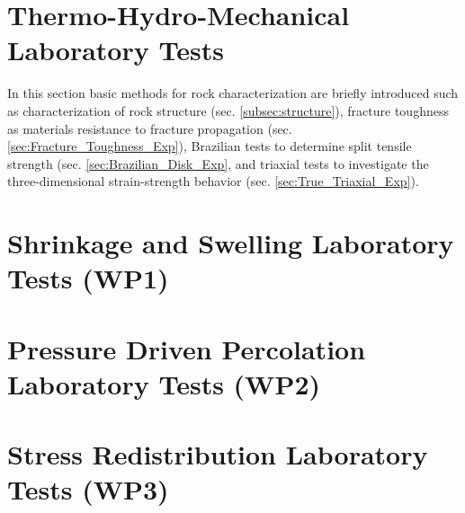 \section{Thermo-Hydro-Mechanical Laboratory Tests}
\label{sec:thm-lab-tests}
In this section basic methods for rock characterization are briefly introduced such as 
characterization of rock structure (sec. \ref{subsec:structure}),
fracture toughness as materials resistance to fracture propagation (sec. \ref{sec:Fracture_Toughness_Exp}),
Brazilian tests to determine split tensile strength (sec. \ref{sec:Brazilian_Disk_Exp},
and triaxial tests to investigate the three-dimensional strain-strength behavior (sec. \ref{sec:True_Triaxial_Exp}).




\clearpage
\section{Shrinkage and Swelling Laboratory Tests (WP1)}
\label{sec:lab-wp1}

\clearpage
\section{Pressure Driven Percolation Laboratory Tests (WP2)}
\label{sec:lab-wp2}

\clearpage
\section{Stress Redistribution Laboratory Tests (WP3)}
\label{sec:lab-wp3}

